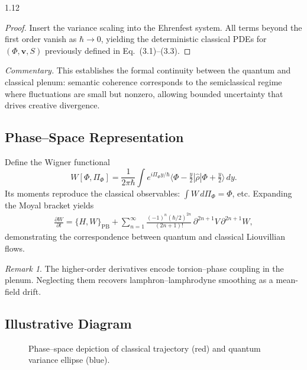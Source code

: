 \documentclass[12pt,a4paper]{article}
\numberwithin{equation}{section}
\theoremstyle{remark}
\newtheorem{remark}{Remark}[section]
\theoremstyle{definition}
\begin{document}
\begin{spacing}{1.12}
\begin{proof}
Insert the variance scaling into the Ehrenfest system.
All terms beyond the first order vanish as \(\hbar\!\to\!0\),
yielding the deterministic classical PDEs for
\((\Phi,\mathbf{v},S)\) previously defined in Eq.~(3.1)--(3.3).
\end{proof}

\noindent\textit{Commentary.}
This establishes the formal continuity between the quantum
and classical plenum: semantic coherence corresponds to the semiclassical regime
where fluctuations are small but nonzero, allowing bounded uncertainty
that drives creative divergence.

\subsection{Phase--Space Representation}

Define the Wigner functional
\[
W[\Phi,\Pi_\Phi] =
\frac{1}{2\pi\hbar}\!\int\!
e^{i\Pi_\Phi y/\hbar}
\langle \Phi-\tfrac{y}{2}|\hat{\rho}|\Phi+\tfrac{y}{2}\rangle\,dy.
\]
Its moments reproduce the classical observables:
\(\int W\,d\Pi_\Phi = \Phi\), etc.
Expanding the Moyal bracket yields
\begin{align}
\frac{\partial W}{\partial t}
= \{H,W\}_{\text{PB}} + \sum_{n=1}^\infty
\frac{(-1)^n(\hbar/2)^{2n}}{(2n+1)!}\,\partial^{2n+1}V\,\partial^{2n+1}W,
\end{align}
demonstrating the correspondence between quantum and classical Liouvillian flows.

\begin{remark}
The higher-order derivatives encode torsion--phase coupling in the plenum.
Neglecting them recovers lamphron--lamphrodyne smoothing as a mean-field drift.
\end{remark}

\subsection{Illustrative Diagram}

\begin{figure}[H]
\centering
{}
\caption{Phase--space depiction of classical trajectory (red) and quantum variance ellipse (blue).}
\label{fig:phase-space}
\end{figure}


\end{spacing}
\end{document}
